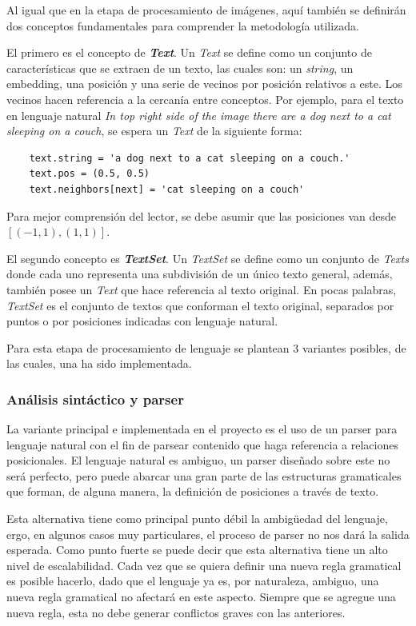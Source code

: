 Al igual que en la etapa de procesamiento de imágenes, aquí también se definirán dos conceptos fundamentales para comprender la metodología utilizada.

El primero es el concepto de \textit{\textbf{Text}}. Un \textit{Text} se define como un conjunto de características que se extraen de un texto, las cuales son: un \textit{string}, un embedding, una posición y una serie de vecinos por posición relativos a este. Los vecinos hacen referencia a la cercanía entre conceptos. Por ejemplo, para el texto en lenguaje natural \textit{In top right side of the image there are a dog next to a cat sleeping on a couch}, se espera un \textit{Text} de la siguiente forma:

\begin{verbatim}
    text.string = 'a dog next to a cat sleeping on a couch.'
    text.pos = (0.5, 0.5)
    text.neighbors[next] = 'cat sleeping on a couch'
\end{verbatim}

Para mejor comprensi\'on del lector, se debe asumir que las posiciones van desde $[(-1,1), (1,1)]$.

El segundo concepto es \textit{\textbf{TextSet}}. Un \textit{TextSet} se define como un conjunto de \textit{Texts} donde cada uno representa una subdivisi\'on de un \'unico texto general, además, también posee un \textit{Text} que hace referencia al texto original. En pocas palabras, \textit{TextSet} es el conjunto de textos que conforman el texto original, separados por puntos o por posiciones indicadas con lenguaje natural.

Para esta etapa de procesamiento de lenguaje se plantean 3 variantes posibles, de las cuales, una ha sido implementada.

\subsubsection{Análisis sintáctico y parser}
La variante principal e implementada en el proyecto es el uso de un parser para lenguaje natural con el fin de parsear contenido que haga referencia a relaciones posicionales. El lenguaje natural es ambiguo, un parser diseñado sobre este no será perfecto, pero puede abarcar una gran parte de las estructuras gramaticales que forman, de alguna manera, la definición de posiciones a través de texto.

Esta alternativa tiene como principal punto débil la ambigüedad del lenguaje, ergo, en algunos casos muy particulares, el proceso de parser no nos dará la salida esperada. Como punto fuerte se puede decir que esta alternativa tiene un alto nivel de escalabilidad. Cada vez que se quiera definir una nueva regla gramatical es posible hacerlo, dado que el lenguaje ya es, por naturaleza, ambiguo, una nueva regla gramatical no afectará en este aspecto. Siempre que se agregue una nueva regla, esta no debe generar conflictos graves con las anteriores.

